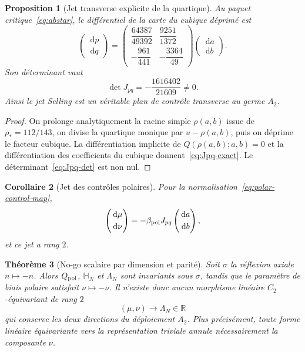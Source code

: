 \documentclass[11pt,a4paper]{article}
\newtheorem{theorem}{Théorème}[section]
\newtheorem{proposition}[theorem]{Proposition}
\newtheorem{corollary}[theorem]{Corollaire}
\newcommand{\R}{\mathbb R}
\newcommand{\dd}{\,\mathrm d}
\begin{document}
\begin{proposition}[Jet transverse explicite de la quartique]
Au paquet critique~\eqref{eq:abstar}, le différentiel de la carte du cubique déprimé est
\begin{equation}\label{eq:Jpq-exact}
 \boxed{
 \begin{pmatrix}\dd p\\[1mm]\dd q\end{pmatrix}
 =
 \begin{pmatrix}
  \dfrac{64387}{49392} & \dfrac{9251}{1372}\\[2mm]
  -\dfrac{961}{441} & -\dfrac{3364}{49}
 \end{pmatrix}
 \begin{pmatrix}\dd a\\[1mm]\dd b\end{pmatrix}.}
\end{equation}
Son déterminant vaut
\begin{equation}\label{eq:Jpq-det}
 \boxed{\det J_{pq}=-\frac{1616402}{21609}\neq0.}
\end{equation}
Ainsi le jet Selling est un véritable plan de contrôle transverse au germe $A_2$.
\end{proposition}

\begin{proof}
On prolonge analytiquement la racine simple $\rho(a,b)$ issue de $\rho_*=112/143$, on divise la quartique monique par $u-\rho(a,b)$, puis on déprime le facteur cubique. La différentiation implicite de $Q(\rho(a,b);a,b)=0$ et la différentiation des coefficients du cubique donnent~\eqref{eq:Jpq-exact}. Le déterminant~\eqref{eq:Jpq-det} est non nul.
\end{proof}

\begin{corollary}[Jet des contrôles polaires]
Pour la normalisation~\eqref{eq:polar-control-map},
\begin{equation}\label{eq:Jmunu}
 \begin{pmatrix}\dd\mu\\[1mm]\dd\nu\end{pmatrix}
 =-\beta_{\rm pol}J_{pq}
 \begin{pmatrix}\dd a\\[1mm]\dd b\end{pmatrix},
\end{equation}
et ce jet a rang $2$.
\end{corollary}

\begin{theorem}[No-go scalaire par dimension et parité]\label{thm:scalar-spectrum-no-go}
Soit $\sigma$ la réflexion axiale $n\mapsto-n$. Alors $Q_{\rm pol}$, $\mathbb H_N$ et $\Lambda_N$ sont invariants sous $\sigma$, tandis que le paramètre de biais polaire satisfait $\nu\mapsto-\nu$. Il n'existe donc aucun morphisme linéaire $C_2$-équivariant de rang $2$
\[
 (\mu,\nu)\longrightarrow \Lambda_N\in\R
\]
qui conserve les deux directions du déploiement $A_2$. Plus précisément, toute forme linéaire équivariante vers la représentation triviale annule nécessairement la composante $\nu$.
\end{theorem}
\end{document}
